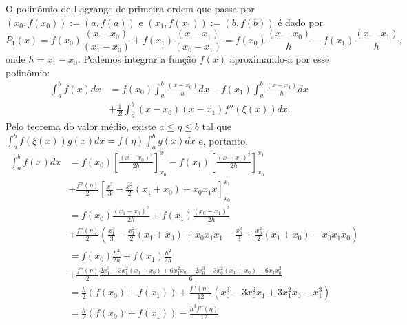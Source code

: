 O polinômio de Lagrange de primeira ordem que passa por $(x_0,f(x_0)):=(a,f(a))$ e $(x_1,f(x_1)):=(b,f(b))$ é dado por
$$
P_1(x)=f(x_0)\frac{(x-x_0)}{(x_1-x_0)}+f(x_1)\frac{(x-x_1)}{(x_0-x_1)}=f(x_0)\frac{(x-x_0)}{h}-f(x_1)\frac{(x-x_1)}{h},
$$
onde $h=x_1-x_0$. Podemos integrar a função $f(x)$ aproximando-a por esse polinômio:
\begin{equation*}
  \begin{split}
    \int_a^bf(x)dx &= f(x_0)\int_a^b\frac{(x-x_0)}{h}dx-f(x_1)\int_a^b\frac{(x-x_1)}{h}dx\\
    &+\frac{1}{2!}\int_a^b(x-x_0)(x-x_1)f''(\xi(x))dx.   
  \end{split}
\end{equation*}
Pelo teorema do valor médio, existe $a\leq \eta\leq b$ tal que $\int_a^bf(\xi(x))g(x)dx=f(\eta)\int_a^bg(x)dx$ e, portanto,
\begin{equation*}
  \begin{split}
    \int_a^bf(x)dx&= f(x_0)\left[\frac{(x-x_0)^2}{2h}\right]_{x_0}^{x_1}-f(x_1)\left[\frac{(x-x_1)^2}{2h}\right]_{x_0}^{x_1}\\
    &+ \frac{f''(\eta)}{2}\left[\frac{x^3}{3}-\frac{x^2}{2}(x_1+x_0)+x_0x_1x\right]_{x_0}^{x_1}\\
&= f(x_0)\frac{(x_1-x_0)^2}{2h}+f(x_1)\frac{(x_0-x_1)^2}{2h}\\
&+ \frac{f''(\eta)}{2}\left(\frac{x_1^3}{3}-\frac{x_1^2}{2}(x_1+x_0)+x_0x_1x_1-\frac{x_0^3}{3}+\frac{x_0^2}{2}(x_1+x_0)-x_0x_1x_0\right)\\
&= f(x_0)\frac{h^2}{2h}+f(x_1)\frac{h^2}{2h}\\
&+ \frac{f''(\eta)}{2}\frac{2x_1^3-3x_1^2(x_1+x_0)+6x_1^2x_0-2x_0^3+3x_0^2(x_1+x_0)-6x_1x_0^2}{6}\\
&= \frac{h}{2}(f(x_0)+f(x_1))+\frac{f''(\eta)}{12}\left(x_0^3-3x_0^2x_1+3x_1^2x_0-x_1^3\right)\\
&= \frac{h}{2}(f(x_0)+f(x_1))-\frac{h^3f''(\eta)}{12}    
  \end{split}
\end{equation*}

